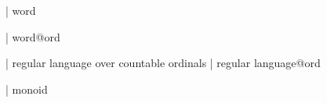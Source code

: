  | word

 | word@ord

 | regular language over countable ordinals
 | regular language@ord

 | monoid
